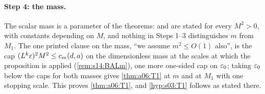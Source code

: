 





















\paragraph{Step 4: the mass.} The scalar mass is a parameter of the theorems: \cite[(1.14)]{Ba1} and \cite[(1.3)]{Ba2} are stated for every $M^2>0$, with constants depending on $M$, and nothing in Steps 1--3 distinguishes $m$ from $M_1$. The one printed clause on the mass, \cite[Prop.~3.1]{Ba2} ``we assume $m^2\le O(1)$ also'', is the cap $(L^k\varepsilon)^2M^2\le c_m(d,a)$ on the dimensionless mass at the scales at which the proposition is applied (\cref{rem:s14:BALm}), one more one-sided cap on $\varepsilon_0$; taking $\varepsilon_0$ below the caps for both masses gives \cref{thm:a06:T1} at $m$ and at $M_1$ with one stopping scale. This proves \cref{thm:a06:T1}, and \cref{hyp:s03:T1} follows as stated there.

